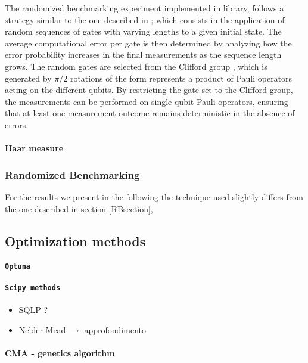 The randomized benchmarking experiment implemented in \Qibocal library, follows a strategy similar to the one described in \cite{knill_randomized_2008}; which consists in the application of random sequences of gates with varying lengths to a given initial state.
The average computational error per gate is then determined by analyzing how the error probability increases in the final measurements as the sequence length grows. 
The random gates are selected from the Clifford group \cite{gottesman1998heisenbergrepresentationquantumcomputers}, which is generated by $\pi/2$ rotations of the form represents a product of Pauli operators acting on the different qubits. 
By restricting the gate set to the Clifford group, the measurements can be performed on single-qubit Pauli operators, ensuring that at least one measurement outcome remains deterministic in the absence of errors.

\paragraph{Haar measure}



\subsubsection{Randomized Benchmarking}
For the results we present in the following the technique used slightly differs from the one described in section \ref{RBsection}, %

\subsection{Optimization methods}
\paragraph{\tt{Optuna}}
\cite{optuna_2019}
\paragraph{\tt{Scipy} methods}
\cite{SciPy-NMeth}
\begin{itemize}
    \item SQLP ?
    \item Nelder-Mead $\rightarrow$ approfondimento
\end{itemize}
\paragraph{CMA - genetics algorithm}
\cite{cmaessimplepractical}

